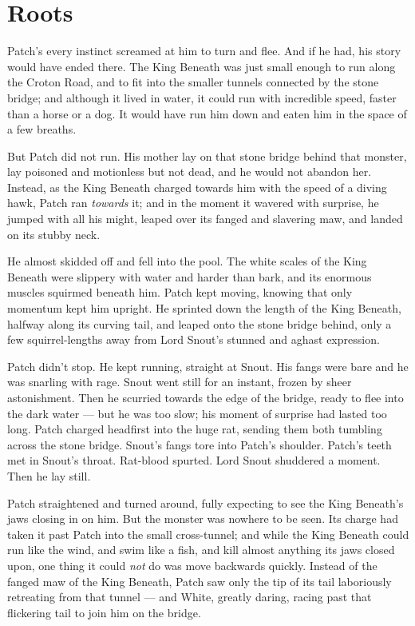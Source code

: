 \documentclass[12pt]{book}
\begin{document}

\section{Roots}

Patch's every instinct screamed at him to turn and flee. And if he
had, his story would have ended there. The King Beneath was just small
enough to run along the Croton Road, and to fit into the smaller
tunnels connected by the stone bridge; and although it lived in water,
it could run with incredible speed, faster than a horse or a dog. It
would have run him down and eaten him in the space of a few breaths.

But Patch did not run. His mother lay on that stone bridge behind that
monster, lay poisoned and motionless but not dead, and he would not
abandon her. Instead, as the King Beneath charged towards him with the
speed of a diving hawk, Patch ran \textit{towards} it; and in the
moment it wavered with surprise, he jumped with all his might, leaped
over its fanged and slavering maw, and landed on its stubby neck.

He almost skidded off and fell into the pool. The white scales of the
King Beneath were slippery with water and harder than bark, and its
enormous muscles squirmed beneath him. Patch kept moving, knowing that
only momentum kept him upright. He sprinted down the length of the
King Beneath, halfway along its curving tail, and leaped onto the
stone bridge behind, only a few squirrel-lengths away from Lord
Snout's stunned and aghast expression.

Patch didn't stop. He kept running, straight at Snout. His fangs were
bare and he was snarling with rage. Snout went still for an instant,
frozen by sheer astonishment. Then he scurried towards the edge of the
bridge, ready to flee into the dark water --- but he was too slow; his
moment of surprise had lasted too long. Patch charged headfirst into
the huge rat, sending them both tumbling across the stone
bridge. Snout's fangs tore into Patch's shoulder. Patch's teeth met in
Snout's throat. Rat-blood spurted. Lord Snout shuddered a moment. Then
he lay still.

Patch straightened and turned around, fully expecting to see the King
Beneath's jaws closing in on him. But the monster was nowhere to be
seen. Its charge had taken it past Patch into the small cross-tunnel;
and while the King Beneath could run like the wind, and swim like a
fish, and kill almost anything its jaws closed upon, one thing it
could \textit{not} do was move backwards quickly. Instead of the
fanged maw of the King Beneath, Patch saw only the tip of its tail
laboriously retreating from that tunnel --- and White, greatly daring,
racing past that flickering tail to join him on the bridge.
\end{document}
